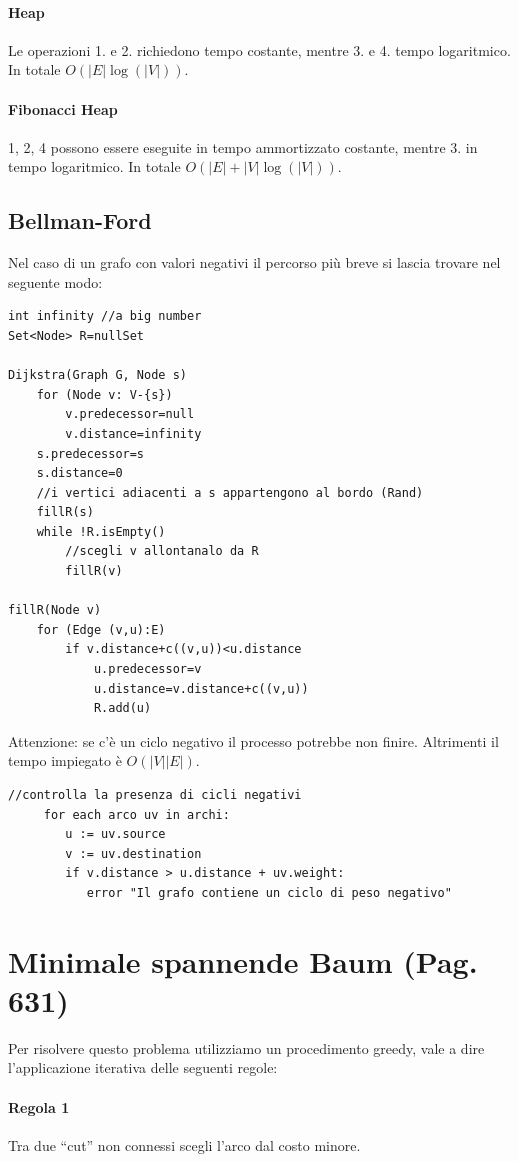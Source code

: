 \documentclass[a4paper]{book}
\newcommand{\lstIndent}{4}
\begin{document}
\paragraph*{Heap}
Le operazioni 1. e 2. richiedono tempo costante, mentre 3. e 4. tempo logaritmico. In totale $O(|E|\log (|V|))$.
\paragraph*{Fibonacci Heap}
1, 2, 4 possono essere eseguite in tempo ammortizzato costante, mentre 3. in tempo logaritmico. In totale $O(|E|+|V|\log (|V|))$.
\subsection*{Bellman-Ford}
Nel caso di un grafo con valori negativi il percorso più breve si lascia trovare nel seguente modo:
\begin{lstlisting}[tabsize=\lstIndent]
int infinity //a big number
Set<Node> R=nullSet
	
Dijkstra(Graph G, Node s)
	for (Node v: V-{s})
		v.predecessor=null
		v.distance=infinity
	s.predecessor=s
	s.distance=0
	//i vertici adiacenti a s appartengono al bordo (Rand)
	fillR(s)
	while !R.isEmpty()
		//scegli v allontanalo da R
		fillR(v)
		
fillR(Node v)
	for (Edge (v,u):E)
		if v.distance+c((v,u))<u.distance
			u.predecessor=v
			u.distance=v.distance+c((v,u))
			R.add(u)				
\end{lstlisting}
Attenzione: se c'è un ciclo negativo il processo potrebbe non finire. Altrimenti il tempo impiegato è $O(|V||E|)$.
\begin{lstlisting}[tabsize=\lstIndent]
     //controlla la presenza di cicli negativi
     for each arco uv in archi:
        u := uv.source
        v := uv.destination
        if v.distance > u.distance + uv.weight:
           error "Il grafo contiene un ciclo di peso negativo"
\end{lstlisting}
\section{Minimale spannende Baum (Pag. 631)}
Per risolvere questo problema utilizziamo un procedimento greedy, vale a dire l'applicazione iterativa delle seguenti regole:
\paragraph*{Regola 1} Tra due ``cut'' non connessi scegli l'arco dal costo minore.
\end{document}
